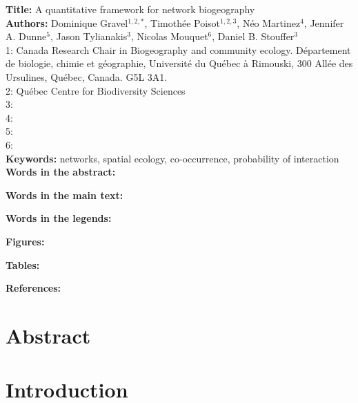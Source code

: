 \documentclass[12pt]{article}
\begin{document}
\linenumbers 
\modulolinenumbers[1]

\textbf{Title:} A quantitative framework for network biogeography\\

\textbf{Authors:} Dominique Gravel$^{1,2,*}$, Timoth\'ee Poisot$^{1,2,3}$, N\'eo
Martinez$^{4}$, Jennifer A. Dunne$^{5}$, Jason Tylianakis$^{3}$, Nicolas
Mouquet$^{6}$, Daniel B. Stouffer$^{3}$ \\

1: Canada Research Chair in Biogeography and community ecology. D\'epartement de
biologie, chimie et g\'eographie, Universit\'e du Qu\'ebec \`a Rimouski, 300
All\'ee des Ursulines, Qu\'ebec, Canada. G5L 3A1.\\

2: Qu\'ebec Centre for Biodiversity Sciences\\

3: \\

4: \\

5: \\

6:\\

\textbf{Keywords:} networks, spatial ecology, co-occurrence, probability of interaction\\

\textbf{Words in the abstract:} 

\textbf{Words in the main text:} 

\textbf{Words in the legends:}  

\textbf{Figures:} 

\textbf{Tables:}     

\textbf{References:} 

\newpage
\doublespacing

\section*{Abstract} 

\newpage
\section*{Introduction}
\end{document}
